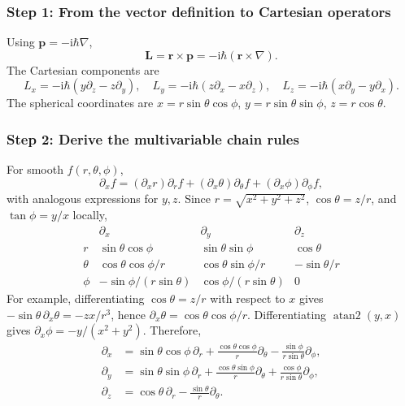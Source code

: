 \documentclass[11pt,a4paper]{article}
\newcommand{\iu}{\mathrm{i}}
\newcommand{\p}{\partial}
\begin{document}
\subsubsection*{Step 1: From the vector definition to Cartesian operators}
Using \(\mathbf p=-\iu\hbar\nabla\),
\begin{equation}\boxed{\mathbf L=\mathbf r\times\mathbf p=-\iu\hbar(\mathbf r\times\nabla).}\end{equation}
The Cartesian components are
\begin{equation}\boxed{L_x=-\iu\hbar(y\p_z-z\p_y),\quad L_y=-\iu\hbar(z\p_x-x\p_z),\quad L_z=-\iu\hbar(x\p_y-y\p_x).}\end{equation}
The spherical coordinates are \(x=r\sin\theta\cos\phi\), \(y=r\sin\theta\sin\phi\), \(z=r\cos\theta\).

\subsubsection*{Step 2: Derive the multivariable chain rules}
For smooth \(f(r,\theta,\phi)\),
\begin{equation}\p_xf=(\p_xr)\p_rf+(\p_x\theta)\p_\theta f+(\p_x\phi)\p_\phi f,\end{equation}
with analogous expressions for \(y,z\). Since \(r=\sqrt{x^2+y^2+z^2}\), \(\cos\theta=z/r\), and \(\tan\phi=y/x\) locally,
\begin{equation}
\begin{array}{c|ccc}
&\p_x&\p_y&\p_z\\\hline
r&\sin\theta\cos\phi&\sin\theta\sin\phi&\cos\theta\\[1mm]
\theta&\cos\theta\cos\phi/r&\cos\theta\sin\phi/r&-\sin\theta/r\\[1mm]
\phi&-\sin\phi/(r\sin\theta)&\cos\phi/(r\sin\theta)&0
\end{array}
\end{equation}
For example, differentiating \(\cos\theta=z/r\) with respect to \(x\) gives \(-\sin\theta\,\p_x\theta=-zx/r^3\), hence \(\p_x\theta=\cos\theta\cos\phi/r\). Differentiating \(\operatorname{atan2}(y,x)\) gives \(\p_x\phi=-y/(x^2+y^2)\). Therefore,
\begin{align}
\p_x&=\sin\theta\cos\phi\,\p_r+\frac{\cos\theta\cos\phi}{r}\p_\theta-\frac{\sin\phi}{r\sin\theta}\p_\phi,\\
\p_y&=\sin\theta\sin\phi\,\p_r+\frac{\cos\theta\sin\phi}{r}\p_\theta+\frac{\cos\phi}{r\sin\theta}\p_\phi,\\
\p_z&=\cos\theta\,\p_r-\frac{\sin\theta}{r}\p_\theta.
\end{align}
\end{document}

